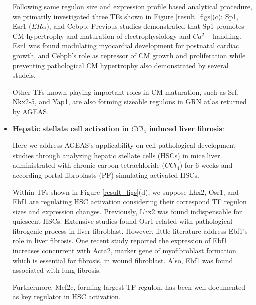 \documentclass[fleqn,10pt]{wlscirep}
\begin{document}
\begin{itemize}
      Following same regulon size and expression profile based analytical procedure, we primarily investigated three TFs shown in Figure \ref{result_figs}(c): Sp1, Esr1 ($ER\alpha$), and Cebpb.
      Previous studies demonstrated that Sp1 promotes CM hypertrophy \cite{sp1_hypertrophy} and maturation of electrophysiology and $Ca^{2+}$ handling. \cite{Sp1_electrophysiologt, CM_mature}
      Esr1 was found modulating myocardial development for postnatal cardiac growth,\cite{esr1_cm, esr1_cm_growth} and Cebpb's role as repressor of CM growth and proliferation while preventing pathological CM hypertrophy also demonstrated by several studeis.\cite{cebpb_1, cebpb_2}

      Other TFs known playing important roles in CM maturation, such as Srf, \cite{CM_mature, cebpb_1} Nkx2-5,\cite{cebpb_1, nkx25, CM_posnatal_mature} and Yap1,\cite{CM_mature, yap1, CM_posnatal_mature} are also forming sizeable regulons in GRN atlas returned by AGEAS.

    \item {\textbf{Hepatic stellate cell activation in $CCl_4$ induced liver fibrosis}}:

      Here we address AGEAS's applicability on cell pathological development studies through analyzing hepatic stellate cells (HSCs) in mice liver administrated with chronic carbon tetrachloride ($CCl_4$) for 6 weeks and according portal fibroblasts (PF) simulating activated HSCs.

      Within TFs shown in Figure \ref{result_figs}(d), we suppose Lhx2, Osr1, and Ebf1 are regulating HSC activation considering their correspond TF regulon sizes and expression changes.
      Previously, Lhx2 was found indispensable for quiescent HSCs. \cite{lhx2_fibro, Lhx2_hsc_1}
      Extensive studies found Osr1 related with pathological fibrogenic process in liver fibroblast. \cite{osr1_1, osr1_2, osr1_3}
      However, little literature address Ebf1's role in liver fibrosis.
      One recent study reported the expression of Ebf1 increases concurrent with Acta2, marker gene of myofibroblast formation\cite{acta2_myofb_marker} which is essential for fibrosis, in wound fibroblast. \cite{ebf1_fibroblast}
      Also, Ebf1 was found associated with lung fibrosis.\cite{ebf1_lung}

      Furthermore, Mef2c, forming largest TF regulon, has been well-documented as key regulator in HSC activation. \cite{mef2c_1, mef2c_2, mef2c_3}

  \end{itemize}
\end{document}
